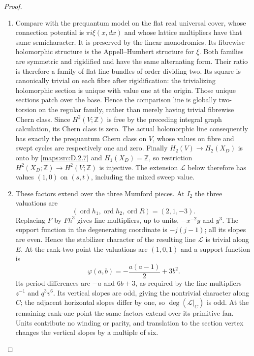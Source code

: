 \begin{proof}
\begin{enumerate}[label=\arabic*.,leftmargin=*]
\item Compare with the prequantum model on the flat real universal
cover, whose connection potential is $\pi i\xi(x,dx)$ and
whose lattice multipliers have that same semicharacter.
It is preserved by the linear monodromies. Its fibrewise
holomorphic structure is the Appell--Humbert structure for $\xi$.
Both families are symmetric and rigidified and have the same
alternating form. Their ratio is therefore a family of flat
line bundles of order dividing two. Its square is canonically
trivial on each fibre after rigidification: the trivializing
holomorphic section is unique with value one at the origin.
Those unique sections patch over the base. Hence the comparison
line is globally two-torsion on the regular family, rather than
merely having trivial fibrewise Chern class. Since $H^2(V;\mathbb Z)$
is free by the preceding integral graph calculation, its Chern
class is zero. The actual holomorphic line consequently has
exactly the prequantum Chern class on $V$, whose values on
fibre and swept cycles are respectively one and zero.
Finally $H_2(V)\to H_2(X_D)$ is onto by \ref{maps:src:D.2.7} and
$H_1(X_D)=\mathbb Z$, so restriction
$H^2(X_D;\mathbb Z)\to H^2(V;\mathbb Z)$ is injective.
The extension $\mathcal L$ below therefore has values $(1,0)$
on $(s,t)$, including the mixed sweep value.

\item These factors extend over the three Mumford pieces. At $I_2$
the three valuations are
\[
 (\operatorname{ord}h_1,\operatorname{ord}h_2,
   \operatorname{ord}R)=(2,1,-3).
\]
Replacing $F$ by $Fh^3$ gives line multipliers, up to units,
$-x^{-2}y$ and $y^3$. The support function in the degenerating
coordinate is $-j(j-1)$; all its slopes are even. Hence the
stabilizer character of the resulting line $\mathcal L$ is
trivial along $E$. At the rank-two point the valuations are
$(1,0,1)$ and a support function is
\[
 \varphi(a,b)=-\frac{a(a-1)}2+3b^2.
\]
Its period differences are $-a$ and $6b+3$, as required by
the line multipliers $z^{-1}$ and $q^3v^6$.
Its vertical slopes are odd, giving the nontrivial character
along $C$; the adjacent horizontal slopes differ by one, so
$\deg(\mathcal L|_C)$ is odd. At the remaining rank-one
point the same factors extend over its primitive fan.
Units contribute no winding or parity, and translation to the
section vertex changes the vertical slopes by a multiple of six.


\end{enumerate}
\end{proof}
